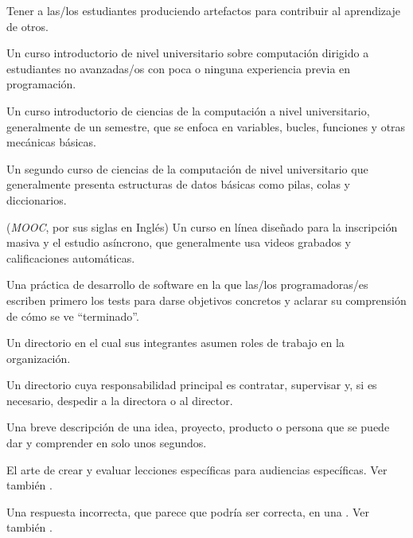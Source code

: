 \begin{description}
 Tener a las/los estudiantes
produciendo artefactos para contribuir al aprendizaje de otros.

 Un curso introductorio de nivel universitario sobre computación
dirigido a estudiantes no avanzadas/os con poca o ninguna experiencia previa en programación.

 Un curso introductorio de ciencias de la computación a nivel universitario,
generalmente de un semestre, que se enfoca en variables, bucles, funciones y otras mecánicas básicas.

 Un segundo curso de ciencias de la computación de nivel universitario
que generalmente presenta estructuras de datos básicas como pilas, colas y diccionarios.

 (\emph{MOOC}, por sus siglas en Inglés) Un curso en línea diseñado para la inscripción masiva y el estudio asíncrono, que generalmente usa videos grabados y calificaciones automáticas.

 Una práctica de desarrollo
de software en la que las/los programadoras/es escriben primero los tests
para darse objetivos concretos y aclarar su comprensión de cómo se ve ``terminado''.

 Un directorio en el cual sus integrantes asumen roles de trabajo en la organización.

 Un directorio cuya responsabilidad principal es
contratar, supervisar y, si es necesario, despedir a la directora o al director.

 Una breve descripción de una idea,
proyecto, producto o persona que se puede dar y comprender en solo unos segundos.

 El arte de crear y evaluar
lecciones específicas para audiencias específicas. Ver también
.

 Una respuesta incorrecta, que parece que podría ser correcta, 
en una . Ver también
.


\end{description}
